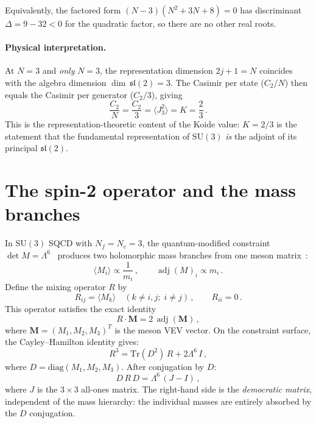 \documentclass[final,3p,times,twocolumn]{elsarticle}
\newcommand{\SU}{\mathrm{SU}}
\newcommand{\Tr}{\mathrm{Tr}}
\newcommand{\adj}{\operatorname{adj}}
\newcommand{\diag}{\mathrm{diag}}
\newcommand{\Nc}{N_{\!c}}
\newcommand{\Nf}{N_{\!f}}
\begin{document}
Equivalently, the factored form
$(N - 3)(N^2 + 3N + 8) = 0$
has discriminant $\Delta = 9 - 32 < 0$ for the quadratic factor,
so there are no other real roots.

\paragraph{Physical interpretation.}
At $N = 3$ and \emph{only} $N = 3$, the representation dimension
$2j + 1 = N$ coincides with the algebra dimension
$\dim\,\mathfrak{sl}(2) = 3$.
The Casimir per state ($C_2/N$) then equals the Casimir per
generator ($C_2/3$), giving
\begin{equation}
  \frac{C_2}{N} = \frac{C_2}{3}
  = \langle J_3^2 \rangle = K = \frac{2}{3}\,.
\end{equation}
This is the representation-theoretic content of the Koide
value: $K = 2/3$ is the statement that the fundamental
representation of $\SU(3)$ \emph{is} the adjoint of its
principal $\mathfrak{sl}(2)$.


\section{The spin-2 operator and the mass branches}
\label{sec:spin2}

In $\SU(3)$ SQCD with $\Nf = \Nc = 3$, the quantum-modified
constraint $\det M = \Lambda^6$~\cite{Seiberg:1995} produces
two holomorphic mass branches from one meson
matrix~\cite{Rivero:2024}:
\begin{equation}
  \langle M_i \rangle \propto \frac{1}{m_i}\,,\qquad
  \adj(M)_i \propto m_i\,.
  \label{eq:branches}
\end{equation}
Define the mixing operator $R$ by
\begin{equation}
  R_{ij} = \langle M_k \rangle
  \quad (k \neq i, j;\; i \neq j)\,,\qquad
  R_{ii} = 0\,.
  \label{eq:Rdef}
\end{equation}
This operator satisfies the exact identity
\begin{equation}
  \boxed{R \cdot \mathbf{M} = 2\,\adj(\mathbf{M})\,,}
  \label{eq:RM}
\end{equation}
where $\mathbf{M} = (M_1, M_2, M_3)^T$ is the meson VEV vector.
On the constraint surface, the Cayley--Hamilton identity gives:
\begin{equation}
  R^3 = \Tr(D^2)\,R + 2\Lambda^6\,I\,,
  \label{eq:cubic}
\end{equation}
where $D = \diag(M_1, M_2, M_3)$.
After conjugation by $D$:
\begin{equation}
  D\,R\,D = \Lambda^6\,(J - I)\,,
  \label{eq:DRD}
\end{equation}
where $J$ is the $3 \times 3$ all-ones matrix.
The right-hand side is the \emph{democratic matrix},
independent of the mass hierarchy: the individual masses
are entirely absorbed by the $D$ conjugation.
\end{document}
